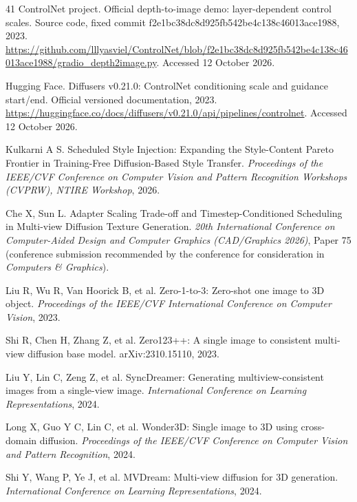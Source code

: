 \documentclass[times,twocolumn,final]{elsarticle}
\begin{document}
\begingroup
\linespread{0.94}\selectfont
\begin{thebibliography}{41}
ControlNet project. Official depth-to-image demo: layer-dependent control scales. Source code, fixed commit f2e1bc38dc8d925fb542be4c138c46013ace1988, 2023. \url{https://github.com/lllyasviel/ControlNet/blob/f2e1bc38dc8d925fb542be4c138c46013ace1988/gradio_depth2image.py}. Accessed 12 October 2026.

Hugging Face. Diffusers v0.21.0: ControlNet conditioning scale and guidance start/end. Official versioned documentation, 2023. \url{https://huggingface.co/docs/diffusers/v0.21.0/api/pipelines/controlnet}. Accessed 12 October 2026.

Kulkarni A S. Scheduled Style Injection: Expanding the Style-Content Pareto Frontier in Training-Free Diffusion-Based Style Transfer. \textit{Proceedings of the IEEE/CVF Conference on Computer Vision and Pattern Recognition Workshops (CVPRW), NTIRE Workshop}, 2026.

Che X, Sun L. Adapter Scaling Trade-off and Timestep-Conditioned Scheduling in Multi-view Diffusion Texture Generation. \textit{20th International Conference on Computer-Aided Design and Computer Graphics (CAD/Graphics 2026)}, Paper 75 (conference submission recommended by the conference for consideration in \textit{Computers \& Graphics}).

Liu R, Wu R, Van Hoorick B, et al. Zero-1-to-3: Zero-shot one image to 3D object. \textit{Proceedings of the IEEE/CVF International Conference on Computer Vision}, 2023.

Shi R, Chen H, Zhang Z, et al. Zero123++: A single image to consistent multi-view diffusion base model. arXiv:2310.15110, 2023.

Liu Y, Lin C, Zeng Z, et al. SyncDreamer: Generating multiview-consistent images from a single-view image. \textit{International Conference on Learning Representations}, 2024.

Long X, Guo Y C, Lin C, et al. Wonder3D: Single image to 3D using cross-domain diffusion. \textit{Proceedings of the IEEE/CVF Conference on Computer Vision and Pattern Recognition}, 2024.

Shi Y, Wang P, Ye J, et al. MVDream: Multi-view diffusion for 3D generation. \textit{International Conference on Learning Representations}, 2024.


\end{thebibliography}
\end{document}
